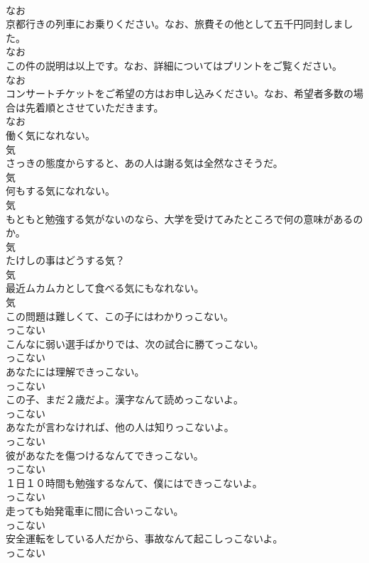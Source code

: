 \documentclass[8pt]{extreport}
\begin{document}
\begin{CJK}{UTF8}{min}
\\	なお
\\	京都行きの列車にお乗りください。なお、旅費その他として五千円同封しました。	
\\	なお
\\	この件の説明は以上です。なお、詳細についてはプリントをご覧ください。	
\\	なお
\\	コンサートチケットをご希望の方はお申し込みください。なお、希望者多数の場合は先着順とさせていただきます。	
\\	なお
\\	働く気になれない。	
\\	気
\\	さっきの態度からすると、あの人は謝る気は全然なさそうだ。	
\\	気
\\	何もする気になれない。	
\\	気
\\	もともと勉強する気がないのなら、大学を受けてみたところで何の意味があるのか。	
\\	気
\\	たけしの事はどうする気？	
\\	気
\\	最近ムカムカとして食べる気にもなれない。	
\\	気
\\	この問題は難しくて、この子にはわかりっこない。	
\\	っこない
\\	こんなに弱い選手ばかりでは、次の試合に勝てっこない。	
\\	っこない
\\	あなたには理解できっこない。	
\\	っこない
\\	この子、まだ２歳だよ。漢字なんて読めっこないよ。	
\\	っこない
\\	あなたが言わなければ、他の人は知りっこないよ。	
\\	っこない
\\	彼があなたを傷つけるなんてできっこない。	
\\	っこない
\\	１日１０時間も勉強するなんて、僕にはできっこないよ。	
\\	っこない
\\	走っても始発電車に間に合いっこない。	
\\	っこない
\\	安全運転をしている人だから、事故なんて起こしっこないよ。	
\\	っこない

\end{CJK}
\end{document}
